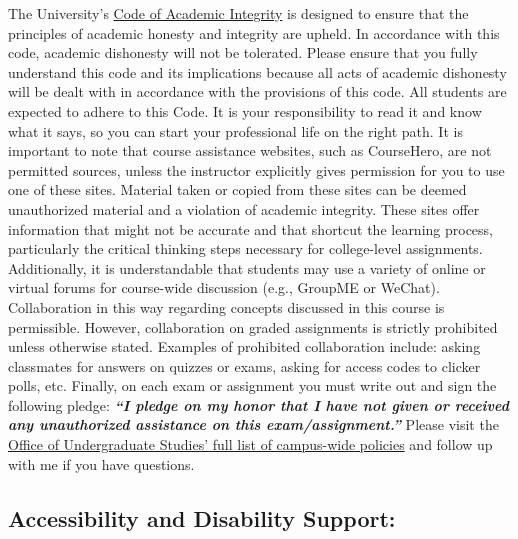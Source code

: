 \documentclass[
]{book}
\begin{document}
The University's \href{https://president.umd.edu/sites/president.umd.edu/files/files/documents/policies/III-100A.pdf}{Code of Academic Integrity} is designed to ensure that the principles of academic honesty and integrity are upheld. In accordance with this code, academic dishonesty will not be tolerated. Please ensure that you fully understand this code and its implications because all acts of academic dishonesty will be dealt with in accordance with the provisions of this code. All students are expected to adhere to this Code. It is your responsibility to read it and know what it says, so you can start your professional life on the right path. It is important to note that course assistance websites, such as CourseHero, are not permitted sources, unless the instructor explicitly gives permission for you to use one of these sites. Material taken or copied from these sites can be deemed unauthorized material and a violation of academic integrity. These sites offer information that might not be accurate and that shortcut the learning process, particularly the critical thinking steps necessary for college-level assignments. Additionally, it is understandable that students may use a variety of online or virtual forums for course-wide discussion (e.g., GroupME or WeChat). Collaboration in this way regarding concepts discussed in this course is permissible. However, collaboration on graded assignments is strictly prohibited unless otherwise stated. Examples of prohibited collaboration include: asking classmates for answers on quizzes or exams, asking for access codes to clicker polls, etc. Finally, on each exam or assignment you must write out and sign the following pledge: \textbf{\emph{``I pledge on my honor that I have not given or received any unauthorized assistance on this exam/assignment.''}} Please visit the \href{http://www.ugst.umd.edu/courserelatedpolicies.html}{Office of Undergraduate Studies' full list of campus-wide policies} and follow up with me if you have questions.

\hypertarget{accessibility-and-disability-support}{%
\subsection{Accessibility and Disability Support:}\label{accessibility-and-disability-support}}
\end{document}
